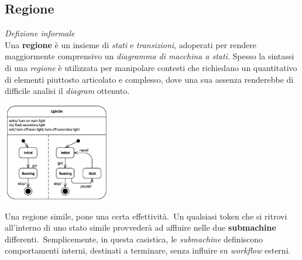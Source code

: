 \documentclass{article}
\begin{document}
\subsection*{Regione}
\large 
\textit{Defizione informale}\\Una \textbf{regione} è un insieme di \textit{stati} e \textit{transizioni}, adoperati per rendere maggiormente comprensivo un \textit{diagramma di macchina a stati}.
Spesso la sintassi di una \textit{regione} è utilizzata per manipolare contesti che richiedano un quantitativo di elementi piuttosto articolato e complesso, dove una sua assenza renderebbe di difficile analisi il \textit{diagram} ottenuto.\vspace*{7pt}
\begin{center}
    \includegraphics*[width=0.35\textwidth]{foto 4.png}
\end{center}
Una regione simile, pone una certa effettività.\ Un qualsiasi token che si ritrovi all'interno di uno stato simile provvederà ad affluire nelle due \textbf{submachine} differenti.\ Semplicemente, in questa casistica, le \textit{submachine} definiscono comportamenti interni, destinati a terminare, senza influire su \textit{workflow} esterni.
\end{document}
